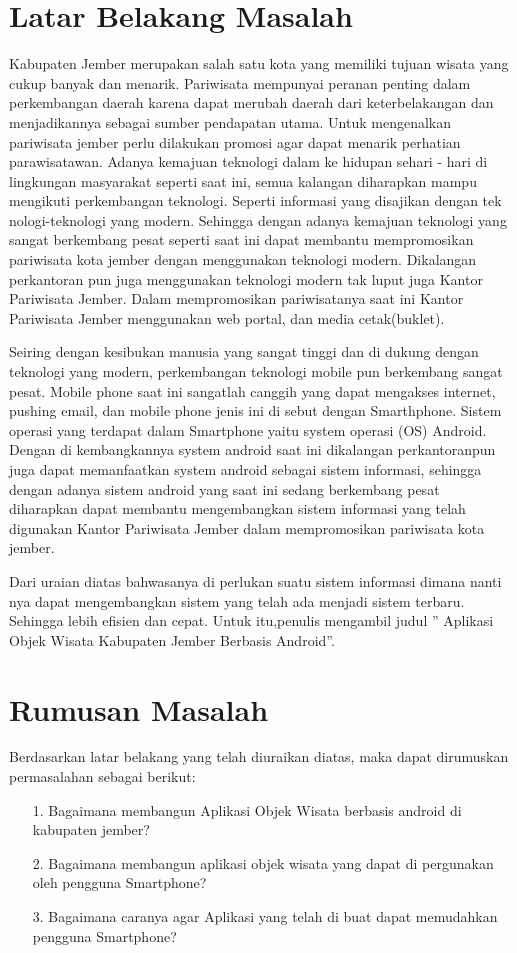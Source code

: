 \documentclass{jtetiproposalskripsi}
\begin{document}
\section{Latar Belakang Masalah}
Kabupaten Jember merupakan salah satu kota yang memiliki tujuan wisata yang cukup banyak dan menarik. Pariwisata mempunyai peranan penting dalam perkembangan daerah karena dapat merubah daerah dari keterbelakangan dan menjadikannya sebagai sumber pendapatan utama. Untuk mengenalkan pariwisata jember perlu dilakukan promosi agar dapat menarik perhatian parawisatawan. Adanya kemajuan teknologi dalam ke hidupan sehari - hari di lingkungan masyarakat seperti saat ini, semua kalangan diharapkan mampu mengikuti perkembangan teknologi. Seperti informasi yang disajikan dengan tek nologi-teknologi yang modern. Sehingga dengan adanya kemajuan teknologi yang sangat berkembang pesat seperti saat ini dapat membantu mempromosikan pariwisata kota jember dengan menggunakan teknologi modern. Dikalangan perkantoran pun juga menggunakan teknologi modern tak luput juga Kantor Pariwisata Jember. Dalam mempromosikan pariwisatanya saat ini Kantor Pariwisata Jember menggunakan web portal, dan media cetak(buklet). 

Seiring dengan kesibukan manusia yang sangat tinggi dan di dukung dengan teknologi yang modern, perkembangan teknologi mobile pun berkembang sangat pesat. Mobile phone saat ini sangatlah canggih yang dapat mengakses internet, pushing email, dan mobile phone jenis ini di sebut dengan Smarthphone. Sistem operasi yang terdapat dalam Smartphone yaitu system operasi (OS) Android. Dengan di kembangkannya system android saat ini dikalangan perkantoranpun juga dapat memanfaatkan system android sebagai sistem informasi, sehingga dengan adanya sistem android yang saat ini sedang berkembang pesat diharapkan dapat membantu mengembangkan sistem informasi yang telah digunakan Kantor Pariwisata Jember dalam mempromosikan pariwisata kota jember.

Dari uraian diatas bahwasanya di perlukan suatu sistem informasi dimana nanti nya dapat mengembangkan sistem yang telah ada menjadi sistem terbaru. Sehingga lebih efisien dan cepat. Untuk itu,penulis mengambil judul ” Aplikasi Objek Wisata Kabupaten Jember Berbasis Android”.


\section{Rumusan Masalah}
Berdasarkan latar belakang yang telah diuraikan diatas, maka dapat dirumuskan permasalahan sebagai berikut:
\begin{itemize}
\item[1.]Bagaimana membangun Aplikasi Objek Wisata berbasis android di kabupaten jember? 
\item[2.]Bagaimana membangun aplikasi objek wisata yang dapat di pergunakan oleh pengguna Smartphone?
\item[3.]Bagaimana caranya agar Aplikasi yang telah di buat dapat memudahkan pengguna Smartphone?
\end{itemize}
\end{document}
